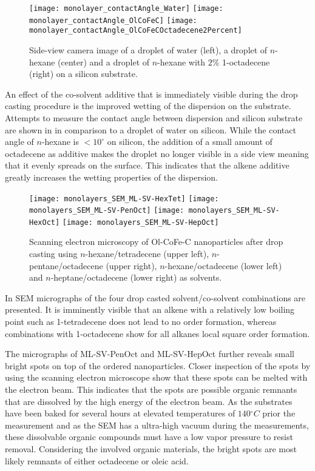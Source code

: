 \documentclass[\main/dresen_thesis.tex]{subfiles}
\begin{document}
    \begin{figure}[tb]
      \centering
      \texttt{[image: monolayer\_contactAngle\_Water]}
      \texttt{[image: monolayer\_contactAngle\_OlCoFeC]}
      \texttt{[image: monolayer\_contactAngle\_OlCoFeCOctadecene2Percent]}
      \caption{\label{fig:monolayers:preparation:contactAngle}Side-view camera image of a droplet of water (left), a droplet of $\mathit{n}$-hexane (center) and a droplet of $\mathit{n}$-hexane with $2 \unit{\%}$ 1-octadecene (right) on a silicon substrate.}
    \end{figure}
    An effect of the co-solvent additive that is immediately visible during the drop casting procedure is the improved wetting of the dispersion on the substrate.
    Attempts to measure the contact angle between dispersion and silicon substrate are shown in  in comparison to a droplet of water on silicon.
    While the contact angle of $\mathit{n}$-hexane is $<10^\circ$ on silicon, the addition of a small amount of octadecene as additive makes the droplet no longer visible in a side view meaning that it evenly spreads on the surface.
    This indicates that the alkene additive greatly increases the wetting properties of the dispersion.

    \begin{figure}[tb]
      \centering
      \texttt{[image: monolayers\_SEM\_ML-SV-HexTet]}
      \texttt{[image: monolayers\_SEM\_ML-SV-PenOct]}
      \texttt{[image: monolayers\_SEM\_ML-SV-HexOct]}
      \texttt{[image: monolayers\_SEM\_ML-SV-HepOct]}
      \caption{\label{fig:monolayers:preparation:solventVariation:sem}Scanning electron microscopy of Ol-CoFe-C nanoparticles after drop casting using $\mathit{n}$-hexane/tetradecene (upper left), $\mathit{n}$-pentane/octadecene (upper right), $\mathit{n}$-hexane/octadecene (lower left) and $\mathit{n}$-heptane/octadecene (lower right) as solvents.}
    \end{figure}
    In  SEM micrographs of the four drop casted solvent/co-solvent combinations are presented.
    It is imminently visible that an alkene with a relatively low boiling point such as 1-tetradecene does not lead to no order formation, whereas  combinations with 1-octadecene show for all alkanes local square order formation.

    The micrographs of ML-SV-PenOct and ML-SV-HepOct further reveals small bright spots on top of the ordered nanoparticles.
    Closer inspection of the spots by using the scanning electron microscope show that these spots can be melted with the electron beam.
    This indicates that the spots are possible organic remnants that are dissolved by the high energy of the electron beam.
    As the substrates have been baked for several hours at elevated temperatures of $140 \unit{^\circ C}$ prior the measurement and as the SEM has a ultra-high vacuum during the measurements, these dissolvable organic compounds must have a low vapor pressure to resist removal.
    Considering the involved organic materials, the bright spots are most likely remnants of either octadecene or oleic acid.
\end{document}
